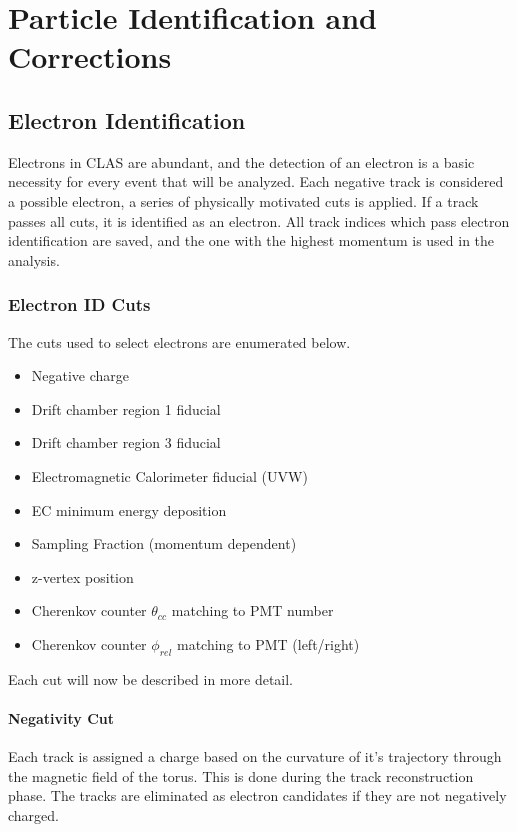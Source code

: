 \chapter{Particle Identification and Corrections}

\section{Electron Identification}
Electrons in CLAS are abundant, and the detection of an electron is a basic necessity for every event that will be analyzed.  Each negative track is considered a possible electron, a series of physically motivated cuts is applied.  If a track passes all cuts, it is identified as an electron.  All track indices which pass electron identification are saved, and the one with the highest momentum is used in the analysis.  
\\


\subsection{Electron ID Cuts}

The cuts used to select electrons are enumerated below.

\begin{itemize}
  \item{Negative charge}
  \item{Drift chamber region 1 fiducial}
  \item{Drift chamber region 3 fiducial}
  \item{Electromagnetic Calorimeter fiducial (UVW)}
  \item{EC minimum energy deposition}
  \item{Sampling Fraction (momentum dependent)}
  \item{z-vertex position}
  \item{Cherenkov counter $\theta_{cc}$ matching to PMT number}
  \item{Cherenkov counter $\phi_{rel}$ matching to PMT (left/right)}
\end{itemize}

Each cut will now be described in more detail.

\subsubsection*{Negativity Cut}
Each track is assigned a charge based on the curvature of it's trajectory through the magnetic field of the torus.  This is done during the track reconstruction phase.  The tracks are eliminated as electron candidates if they are not negatively charged.

